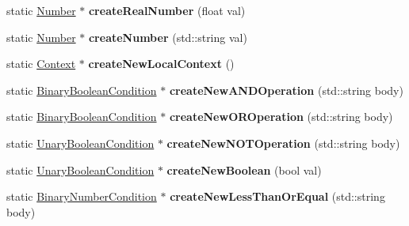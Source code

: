 \begin{DoxyCompactItemize}
\item 
\hypertarget{class_factory_a63257c7056b6a95ffabeba379cb91bf9}{static \hyperlink{class_number}{Number} $\ast$ {\bfseries create\-Real\-Number} (float val)}\label{class_factory_a63257c7056b6a95ffabeba379cb91bf9}

\item 
\hypertarget{class_factory_afe22780981f76f177804f606f43f9699}{static \hyperlink{class_number}{Number} $\ast$ {\bfseries create\-Number} (std\-::string val)}\label{class_factory_afe22780981f76f177804f606f43f9699}

\item 
\hypertarget{class_factory_a2618c1e3fe60d0c95e065eb31cf4c165}{static \hyperlink{class_context}{Context} $\ast$ {\bfseries create\-New\-Local\-Context} ()}\label{class_factory_a2618c1e3fe60d0c95e065eb31cf4c165}

\item 
\hypertarget{class_factory_a787e45866dd2dcadd4623ebea9bff41e}{static \hyperlink{class_binary_boolean_condition}{Binary\-Boolean\-Condition} $\ast$ {\bfseries create\-New\-A\-N\-D\-Operation} (std\-::string body)}\label{class_factory_a787e45866dd2dcadd4623ebea9bff41e}

\item 
\hypertarget{class_factory_a6b9e1d0c972e9c50c21d289c3539a8cb}{static \hyperlink{class_binary_boolean_condition}{Binary\-Boolean\-Condition} $\ast$ {\bfseries create\-New\-O\-R\-Operation} (std\-::string body)}\label{class_factory_a6b9e1d0c972e9c50c21d289c3539a8cb}

\item 
\hypertarget{class_factory_ab66c0668a22c434167cf2304d2fd2f5d}{static \hyperlink{class_unary_boolean_condition}{Unary\-Boolean\-Condition} $\ast$ {\bfseries create\-New\-N\-O\-T\-Operation} (std\-::string body)}\label{class_factory_ab66c0668a22c434167cf2304d2fd2f5d}

\item 
\hypertarget{class_factory_a829f2144264e2a42ad2262d17dc2d89d}{static \hyperlink{class_unary_boolean_condition}{Unary\-Boolean\-Condition} $\ast$ {\bfseries create\-New\-Boolean} (bool val)}\label{class_factory_a829f2144264e2a42ad2262d17dc2d89d}

\item 
\hypertarget{class_factory_a2b3007496f889a25ec1a4e7f44f2c156}{static \hyperlink{class_binary_number_condition}{Binary\-Number\-Condition} $\ast$ {\bfseries create\-New\-Less\-Than\-Or\-Equal} (std\-::string body)}\label{class_factory_a2b3007496f889a25ec1a4e7f44f2c156}


\end{DoxyCompactItemize}
